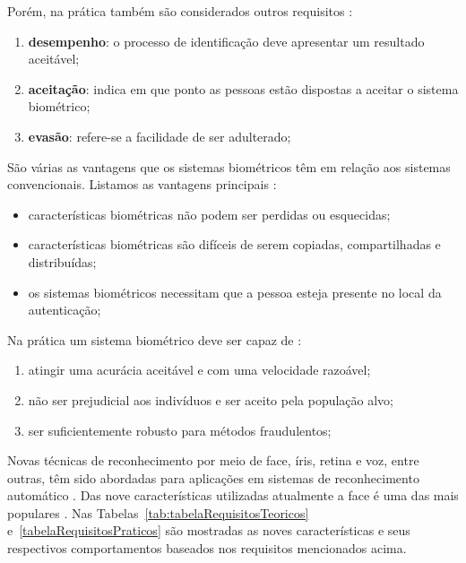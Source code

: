 	Porém, na prática também são considerados outros requisitos \cite{milene}:

	\begin{enumerate}
		\item \textbf{desempenho}: o processo de identificação deve apresentar um resultado aceitável;
		\item \textbf{aceitação}: indica em que ponto as pessoas estão dispostas a aceitar o sistema biométrico;
		\item \textbf{evasão}: refere-se a facilidade de ser adulterado;
	\end{enumerate}

	São várias as vantagens que os sistemas biométricos têm em relação aos sistemas
	convencionais. Listamos as vantagens principais \cite{drovetto}:
		
	\begin{itemize}
		\item características biométricas não podem ser perdidas ou esquecidas;
		\item características biométricas são difíceis de serem copiadas, compartilhadas e distribuídas;
		\item os sistemas biométricos necessitam que a pessoa esteja presente no local da autenticação;
	\end{itemize}

	Na prática um sistema biométrico deve ser capaz de \cite{hong}:
		
	\begin{enumerate}
		\item atingir uma acurácia aceitável e com uma velocidade razoável;
		\item não ser prejudicial aos indivíduos e ser aceito pela população alvo;
		\item ser suficientemente robusto para métodos fraudulentos;
	\end{enumerate}

	Novas técnicas de reconhecimento por meio de face, íris, retina e voz, entre
	outras, têm sido abordadas para aplicações em sistemas de reconhecimento
	automático \cite{bolle,saocarlos}. Das nove características utilizadas
	atualmente a face é uma das mais populares \cite{milene}. Nas Tabelas~\ref{tab:tabelaRequisitosTeoricos} e~\ref{tabelaRequisitosPraticos} são
	mostradas as noves características e seus respectivos comportamentos baseados nos requisitos
	mencionados acima.
		
